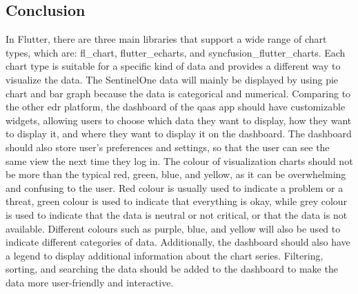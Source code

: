 



\subsection{Conclusion}
In Flutter, there are three main libraries that support a wide range of chart types, which are: fl\_chart,
flutter\_echarts, and syncfusion\_flutter\_charts. Each chart type is suitable for a specific kind of data
and provides a different way to visualize the data. The SentinelOne data will mainly be displayed by using
pie chart and bar graph because the data is categorical and numerical. Comparing to the other \acrshort{edr}
platform, the dashboard of the \acrshort{qaas} app should have customizable widgets, allowing users to
choose which data they want to display, how they want to display it, and where they want to display it on
the dashboard. The dashboard should also store user's preferences and settings, so that the user can see
the same view the next time they log in. The colour of visualization charts should not be more than the
typical red, green, blue, and yellow, as it can be overwhelming and confusing to the user. Red colour is
usually used to indicate a problem or a threat,  green colour is used to indicate that everything is okay,
while grey colour is used to indicate that the data is neutral or not critical, or that the data is not
available. Different colours such as purple, blue, and yellow will also be used to indicate different
categories of data. Additionally, the dashboard should also have a legend to display additional information
about the chart series. Filtering, sorting, and searching the data should be added to the dashboard to make
the data more user-friendly and interactive.


